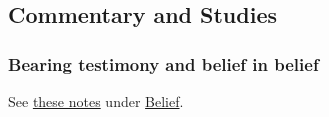 	


	
	
	
	
\subsection{Commentary and Studies} %
	\label{TESTIMONY-COMMENTARY}

	
		
	\subsubsection{Bearing testimony and belief in belief}
		
		See \hyperref[BELIEF-belief]{these notes} under \hyperref[BELIEF]{Belief}.
